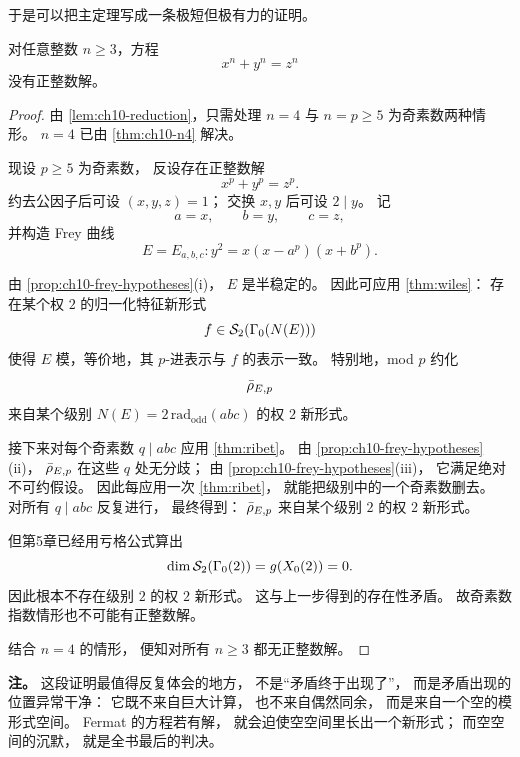 于是可以把主定理写成一条极短但极有力的证明。

\begin{theorem}[费马大定理]
\label{thm:flt}
对任意整数 $n\ge 3$，方程
\[
  x^n+y^n=z^n
\]
没有正整数解。
\end{theorem}

\begin{proof}
由 \cref{lem:ch10-reduction}，只需处理 $n=4$ 与 $n=p\ge 5$ 为奇素数两种情形。
$n=4$ 已由 \cref{thm:ch10-n4} 解决。

现设 $p\ge 5$ 为奇素数，
反设存在正整数解
\[
  x^p+y^p=z^p.
\]
约去公因子后可设 $(x,y,z)=1$；
交换 $x,y$ 后可设 $2\mid y$。
记
\[
  a=x,\qquad b=y,\qquad c=z,
\]
并构造 Frey 曲线
\[
  E=E_{a,b,c}\colon y^2=x(x-a^p)(x+b^p).
\]

由 \cref{prop:ch10-frey-hypotheses}(i)，
$E$ 是半稳定的。
因此可应用 \cref{thm:wiles}：
存在某个权 $2$ 的归一化特征新形式
\[
  f\in \mathcal{S}_2(\Gamma_0(N(E)))
\]
使得 $E$ 模，等价地，其 $p$-进表示与 $f$ 的表示一致。
特别地，mod $p$ 约化
\[
  \bar{\rho}_{E,p}
\]
来自某个级别 $N(E)=2\,\mathrm{rad}_{\mathrm{odd}}(abc)$ 的权 $2$ 新形式。

接下来对每个奇素数 $q\mid abc$ 应用 \cref{thm:ribet}。
由 \cref{prop:ch10-frey-hypotheses}(ii)，
$\bar{\rho}_{E,p}$ 在这些 $q$ 处无分歧；
由 \cref{prop:ch10-frey-hypotheses}(iii)，
它满足绝对不可约假设。
因此每应用一次 \cref{thm:ribet}，
就能把级别中的一个奇素数删去。
对所有 $q\mid abc$ 反复进行，
最终得到：
$\bar{\rho}_{E,p}$ 来自某个级别 $2$ 的权 $2$ 新形式。

但第5章已经用亏格公式算出
\[
  \dim \mathcal{S}_2(\Gamma_0(2))=g(X_0(2))=0.
\]
因此根本不存在级别 $2$ 的权 $2$ 新形式。
这与上一步得到的存在性矛盾。
故奇素数指数情形也不可能有正整数解。

结合 $n=4$ 的情形，
便知对所有 $n\ge 3$ 都无正整数解。
\end{proof}

\textbf{注。}
这段证明最值得反复体会的地方，
不是“矛盾终于出现了”，
而是矛盾出现的位置异常干净：
它既不来自巨大计算，
也不来自偶然同余，
而是来自一个空的模形式空间。
Fermat 的方程若有解，
就会迫使空空间里长出一个新形式；
而空空间的沉默，
就是全书最后的判决。
